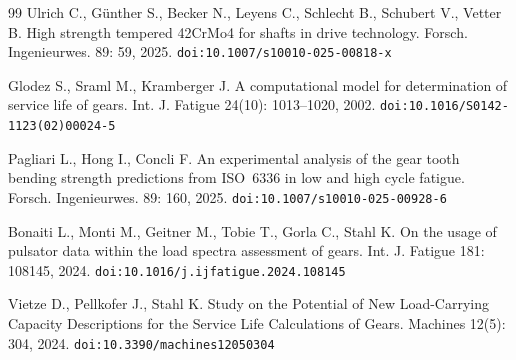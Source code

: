 \documentclass[twocolumn,12pt,a4paper]{article}
\begin{document}
\begin{thebibliography}{99}
Ulrich C., G\"unther S., Becker N., Leyens C., Schlecht B., Schubert V.,
Vetter B. High strength tempered 42CrMo4 for shafts in drive technology.
Forsch. Ingenieurwes. 89: 59, 2025.
\texttt{doi:10.1007/s10010-025-00818-x}

Glodez S., Sraml M., Kramberger J. A computational model for
determination of service life of gears. Int. J. Fatigue 24(10):
1013--1020, 2002. \texttt{doi:10.1016/S0142-1123(02)00024-5}

Pagliari L., Hong I., Concli F. An experimental analysis of the gear
tooth bending strength predictions from ISO~6336 in low and high cycle
fatigue. Forsch. Ingenieurwes. 89: 160, 2025.
\texttt{doi:10.1007/s10010-025-00928-6}

Bonaiti L., Monti M., Geitner M., Tobie T., Gorla C., Stahl K.
On the usage of pulsator data within the load spectra assessment of
gears. Int. J. Fatigue 181: 108145, 2024.
\texttt{doi:10.1016/j.ijfatigue.2024.108145}

Vietze D., Pellkofer J., Stahl K. Study on the Potential of New
Load-Carrying Capacity Descriptions for the Service Life Calculations
of Gears. Machines 12(5): 304, 2024.
\texttt{doi:10.3390/machines12050304}

\end{thebibliography}
\end{document}
